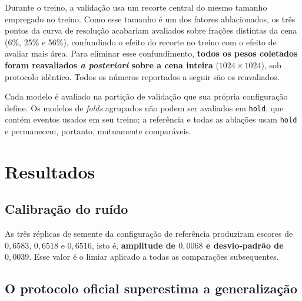\documentclass[11pt,a4paper]{article}
\begin{document}
Durante o treino, a validação usa um recorte central do mesmo tamanho empregado
no treino. Como esse tamanho é um dos fatores ablacionados, os três pontos da
curva de resolução acabariam avaliados sobre frações distintas da cena (6\%,
25\% e 56\%), confundindo o efeito do recorte no treino com o efeito de avaliar
mais área. Para eliminar esse confundimento, \textbf{todos os pesos coletados
foram reavaliados \emph{a posteriori} sobre a cena inteira} ($1024\times1024$),
sob protocolo idêntico. Todos os números reportados a seguir são os reavaliados.

Cada modelo é avaliado na partição de validação que sua própria configuração
define. Os modelos de \emph{folds} agrupados não podem ser avaliados em
\texttt{hold}, que contém eventos usados em seu treino; a referência e todas as
ablações usam \texttt{hold} e permanecem, portanto, mutuamente comparáveis.

\section{Resultados}

\subsection{Calibração do ruído}

As três réplicas de semente da configuração de referência produziram escores de
$0{,}6583$, $0{,}6518$ e $0{,}6516$, isto é, \textbf{amplitude de $0{,}0068$ e
desvio-padrão de $0{,}0039$}. Esse valor é o limiar aplicado a todas as
comparações subsequentes.

\subsection{O protocolo oficial superestima a generalização}
\label{sec:generalizacao}
\end{document}
